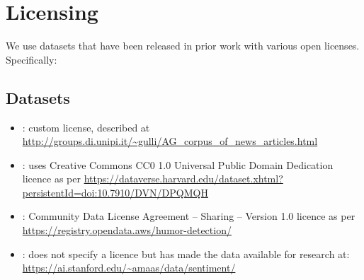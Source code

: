 \section{Licensing}

We use datasets that have been released in prior work with various open licenses. Specifically:

\subsection{Datasets}
\begin{itemize}
    \item \AGNews: custom license, described at \url{http://groups.di.unipi.it/~gulli/AG_corpus_of_news_articles.html}
    \item \ToIHeadlines: uses Creative Commons CC0 1.0 Universal Public Domain Dedication licence as per
 \url{https://dataverse.harvard.edu/dataset.xhtml?persistentId=doi:10.7910/DVN/DPQMQH}
    \item \Humor: Community Data License Agreement – Sharing – Version 1.0 licence as per \url{https://registry.opendata.aws/humor-detection/}
    \item \IMDb: \citep{maas-etal-2011-learning} does not specify a licence but has made the data available for research at: \url{https://ai.stanford.edu/~amaas/data/sentiment/}
\end{itemize}

